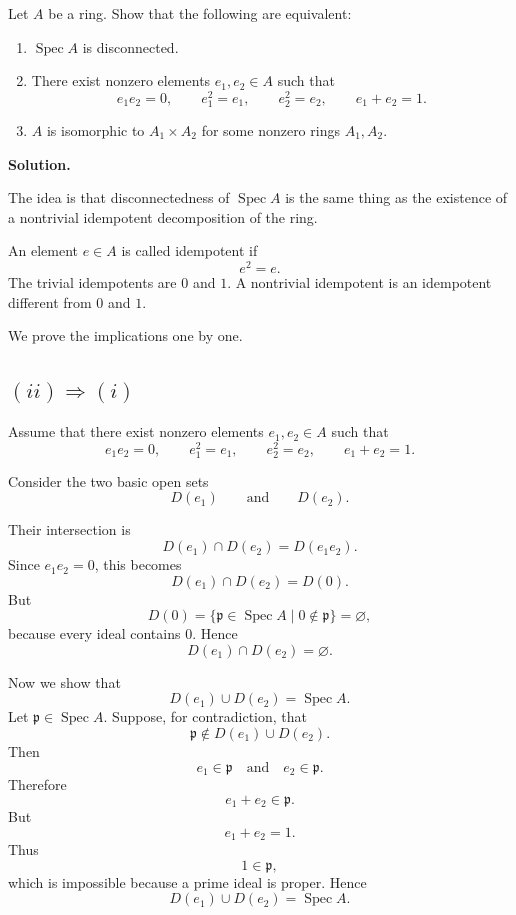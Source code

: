 \documentclass[12pt,a4paper]{article}
\newcommand{\Spec}{\operatorname{Spec}}
\begin{document}
	Let \(A\) be a ring. Show that the following are equivalent:
	
	\begin{enumerate}[label=\roman*)]
		\item \(\Spec A\) is disconnected.
		
		\item There exist nonzero elements \(e_1,e_2\in A\) such that
		\[
		e_1e_2=0,
		\qquad
		e_1^2=e_1,
		\qquad
		e_2^2=e_2,
		\qquad
		e_1+e_2=1.
		\]
		
		\item \(A\) is isomorphic to \(A_1\times A_2\) for some nonzero rings
		\(A_1,A_2\).
	\end{enumerate}
	
	\bigskip
	
	\textbf{Solution.}
	
	The idea is that disconnectedness of \(\Spec A\) is the same thing as the
	existence of a nontrivial idempotent decomposition of the ring.
	
	An element \(e\in A\) is called idempotent if
	\[
	e^2=e.
	\]
	The trivial idempotents are \(0\) and \(1\). A nontrivial idempotent is an
	idempotent different from \(0\) and \(1\).
	
	We prove the implications one by one.
	
	\subsection*{\((ii)\Rightarrow(i)\)}
	
	Assume that there exist nonzero elements \(e_1,e_2\in A\) such that
	\[
	e_1e_2=0,
	\qquad
	e_1^2=e_1,
	\qquad
	e_2^2=e_2,
	\qquad
	e_1+e_2=1.
	\]
	
	Consider the two basic open sets
	\[
	D(e_1)
	\qquad\text{and}\qquad
	D(e_2).
	\]
	
	Their intersection is
	\[
	D(e_1)\cap D(e_2)=D(e_1e_2).
	\]
	Since \(e_1e_2=0\), this becomes
	\[
	D(e_1)\cap D(e_2)=D(0).
	\]
	But
	\[
	D(0)=\{\mathfrak p\in\Spec A\mid 0\notin \mathfrak p\}=\varnothing,
	\]
	because every ideal contains \(0\). Hence
	\[
	D(e_1)\cap D(e_2)=\varnothing.
	\]
	
	Now we show that
	\[
	D(e_1)\cup D(e_2)=\Spec A.
	\]
	Let \(\mathfrak p\in\Spec A\). Suppose, for contradiction, that
	\[
	\mathfrak p\notin D(e_1)\cup D(e_2).
	\]
	Then
	\[
	e_1\in\mathfrak p
	\quad\text{and}\quad
	e_2\in\mathfrak p.
	\]
	Therefore
	\[
	e_1+e_2\in \mathfrak p.
	\]
	But
	\[
	e_1+e_2=1.
	\]
	Thus
	\[
	1\in\mathfrak p,
	\]
	which is impossible because a prime ideal is proper. Hence
	\[
	D(e_1)\cup D(e_2)=\Spec A.
	\]
	
\end{document}
